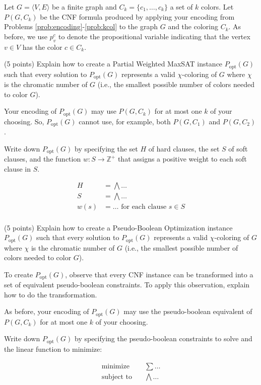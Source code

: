 \documentclass{handout}
\begin{document}
Let $G = \langle V, E\rangle$ be a finite graph and $C_k = \{ c_1, \ldots, c_k \}$ a set of $k$ colors.
Let $P(G, C_k)$ be the CNF formula produced by applying your encoding from Problems \ref{prob:encoding}-\ref{prob:kcol}
to the graph $G$ and the coloring $C_k$.
As before, we use $p_v^c$ to denote the propositional variable indicating that the vertex $v\in V$ has the color $c\in C_k$.


\begin{questions}

\item (5 points) Explain how to create a Partial Weighted MaxSAT instance $P_{\text{opt}}(G)$
such that every solution to $P_{\text{opt}}(G)$ represents a valid $\chi$-coloring of $G$ where $\chi$ is
the chromatic number of $G$ (i.e., the smallest possible number of colors needed to color $G$).

Your encoding of  $P_{\text{opt}}(G)$ may use $P(G, C_k)$ for at most one $k$ of your choosing.
So, $P_{\text{opt}}(G)$ cannot use, for example, both $P(G, C_1)$ and $P(G, C_2)$.

Write down  $P_{\text{opt}}(G)$ by specifying the set $H$ of hard clauses,
the set $S$ of soft clauses, and the function $w : S \rightarrow \mathbb{Z^+}$ that assigns a positive weight to each soft clause in $S$.

\begin{align*}
   H    	&=     \bigwedge \ldots \\
   S    	&=     \bigwedge \ldots \\
   w(s)    	&=    \ldots \text{ for each clause } s  \in S\\
\end{align*}



\item (5 points)  Explain how to create a Pseudo-Boolean Optimization instance $P_{\text{opt}}(G)$
such that every solution to $P_{\text{opt}}(G)$ represents a valid $\chi$-coloring of $G$ where $\chi$ is
the chromatic number of $G$ (i.e., the smallest possible number of colors needed to color $G$).

To create $P_{\text{opt}}(G)$, observe that every CNF instance
can be transformed into a set of equivalent pseudo-boolean constraints.
To apply this observation, explain how to do the transformation.

As before, your encoding of  $P_{\text{opt}}(G)$ may use the  pseudo-boolean equivalent of  $P(G, C_k)$ for at most one $k$ of your choosing.


Write down  $P_{\text{opt}}(G)$ by specifying the pseudo-boolean constraints to solve and the linear function to minimize:

\begin{align*}
   \text{minimize}  	 \quad& \sum \ldots \\
   \text{subject to}    	\quad&  \bigwedge \ldots \\
\end{align*}




\end{questions}
\end{document}
